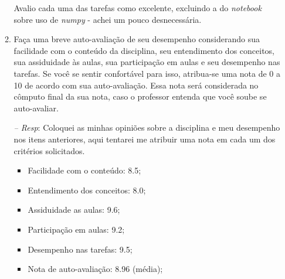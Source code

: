 \documentclass[12pt]{article}
\begin{document}
\begin{enumerate}
\begin{enumerate}
		Avalio cada uma das tarefas como excelente, excluindo a do \textit{notebook} sobre uso de \textit{numpy} - achei um pouco desnecessária.				
		\item Faça uma breve auto-avaliação de seu desempenho considerando sua 
		         facilidade com o conteúdo da disciplina, seu entendimento dos 
		         conceitos, sua assiduidade às aulas, sua
		         participação em aulas e seu desempenho nas tarefas. Se você se
		         sentir confortável para isso, atribua-se uma nota de 0 a 10
		         de acordo com sua auto-avaliação. Essa nota será considerada
		         no cômputo final da sua nota, caso o professor entenda que
		         você soube se auto-avaliar.
		\item[\textit{-- Resp}:] Coloquei as minhas opiniões sobre a disciplina e meu desempenho nos itens anteriores, aqui tentarei me atribuir uma nota em cada um dos critérios solicitados.
		\begin{itemize}
			\item Facilidade com o conteúdo: 8.5;	
			\item Entendimento dos conceitos: 8.0;
			\item Assiduidade as aulas: 9.6;
			\item Participação em aulas: 9.2;
			\item Desempenho nas tarefas: 9.5;
			\item Nota de auto-avaliação: 8.96 (média);
		\end{itemize}
	\end{enumerate}

\end{enumerate}
\end{document}
